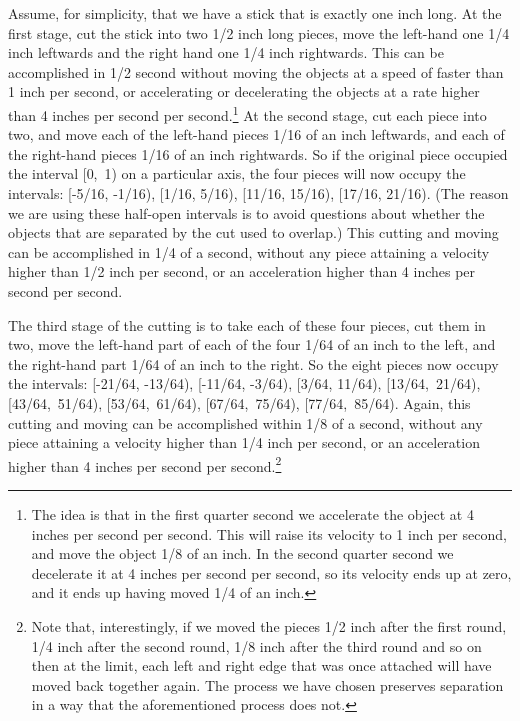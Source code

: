 \documentclass[
  10pt,
  letterpaper,
  DIV=11,
  numbers=noendperiod,
  twoside]{scrartcl}
\begin{document}
Assume, for simplicity, that we have a stick that is exactly one inch
long. At the first stage, cut the stick into two 1/2 inch long pieces,
move the left-hand one 1/4 inch leftwards and the right hand one 1/4
inch rightwards. This can be accomplished in 1/2 second without moving
the objects at a speed of faster than 1 inch per second, or accelerating
or decelerating the objects at a rate higher than 4 inches per second
per second.\footnote{The idea is that in the first quarter second we
  accelerate the object at 4 inches per second per second. This will
  raise its velocity to 1 inch per second, and move the object 1/8 of an
  inch. In the second quarter second we decelerate it at 4 inches per
  second per second, so its velocity ends up at zero, and it ends up
  having moved 1/4 of an inch.} At the second stage, cut each piece into
two, and move each of the left-hand pieces 1/16 of an inch leftwards,
and each of the right-hand pieces 1/16 of an inch rightwards. So if the
original piece occupied the interval {[}0,~1) on a particular axis, the
four pieces will now occupy the intervals: {[}-5/16, -1/16), {[}1/16,
5/16), {[}11/16, 15/16), {[}17/16, 21/16). (The reason we are using
these half-open intervals is to avoid questions about whether the
objects that are separated by the cut used to overlap.) This cutting and
moving can be accomplished in 1/4 of a second, without any piece
attaining a velocity higher than 1/2 inch per second, or an acceleration
higher than 4 inches per second per second.

The third stage of the cutting is to take each of these four pieces, cut
them in two, move the left-hand part of each of the four 1/64 of an inch
to the left, and the right-hand part 1/64 of an inch to the right. So
the eight pieces now occupy the intervals: {[}-21/64, -13/64),
{[}-11/64, -3/64), {[}3/64, 11/64), {[}13/64,~21/64), {[}43/64,~51/64),
{[}53/64,~61/64), {[}67/64,~75/64), {[}77/64,~85/64). Again, this
cutting and moving can be accomplished within 1/8 of a second, without
any piece attaining a velocity higher than 1/4 inch per second, or an
acceleration higher than 4 inches per second per second.\footnote{Note
  that, interestingly, if we moved the pieces 1/2 inch after the first
  round, 1/4 inch after the second round, 1/8 inch after the third round
  and so on then at the limit, each left and right edge that was once
  attached will have moved back together again. The process we have
  chosen preserves separation in a way that the aforementioned process
  does not.}
\end{document}
